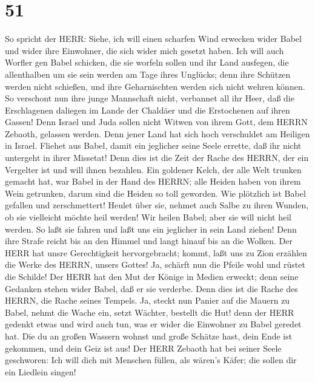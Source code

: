 \hypertarget{section-50}{%
\section{51}\label{section-50}}

 So spricht der HERR: Siehe, ich will einen scharfen Wind
erwecken wider Babel und wider ihre Einwohner, die sich wider mich
gesetzt haben.  Ich will auch Worfler gen Babel schicken,
die sie worfeln sollen und ihr Land ausfegen, die allenthalben um sie
sein werden am Tage ihres Unglücks;  denn ihre Schützen
werden nicht schießen, und ihre Geharnischten werden sich nicht wehren
können. So verschont nun ihre junge Mannschaft nicht, verbannet all ihr
Heer,  daß die Erschlagenen daliegen im Lande der Chaldäer
und die Erstochenen auf ihren Gassen!  Denn Israel und Juda
sollen nicht Witwen von ihrem Gott, dem HERRN Zebaoth, gelassen werden.
Denn jener Land hat sich hoch verschuldet am Heiligen in Israel.
 Fliehet aus Babel, damit ein jeglicher seine Seele errette,
daß ihr nicht untergeht in ihrer Missetat! Denn dies ist die Zeit der
Rache des HERRN, der ein Vergelter ist und will ihnen bezahlen.
 Ein goldener Kelch, der alle Welt trunken gemacht hat, war
Babel in der Hand des HERRN; alle Heiden haben von ihrem Wein getrunken,
darum sind die Heiden so toll geworden.  Wie plötzlich ist
Babel gefallen und zerschmettert! Heulet über sie, nehmet auch Salbe zu
ihren Wunden, ob sie vielleicht möchte heil werden!  Wir
heilen Babel; aber sie will nicht heil werden. So laßt sie fahren und
laßt uns ein jeglicher in sein Land ziehen! Denn ihre Strafe reicht bis
an den Himmel und langt hinauf bis an die Wolken.  Der HERR
hat unsre Gerechtigkeit hervorgebracht; kommt, laßt uns zu Zion erzählen
die Werke des HERRN, unsers Gottes!  Ja, schärft nun die
Pfeile wohl und rüstet die Schilde! Der HERR hat den Mut der Könige in
Medien erweckt; denn seine Gedanken stehen wider Babel, daß er sie
verderbe. Denn dies ist die Rache des HERRN, die Rache seines Tempels.
 Ja, steckt nun Panier auf die Mauern zu Babel, nehmt die
Wache ein, setzt Wächter, bestellt die Hut! denn der HERR gedenkt etwas
und wird auch tun, was er wider die Einwohner zu Babel geredet hat.
 Die du an großen Wassern wohnst und große Schätze hast,
dein Ende ist gekommen, und dein Geiz ist aus!  Der HERR
Zebaoth hat bei seiner Seele geschworen: Ich will dich mit Menschen
füllen, als wären's Käfer; die sollen dir ein Liedlein singen!
